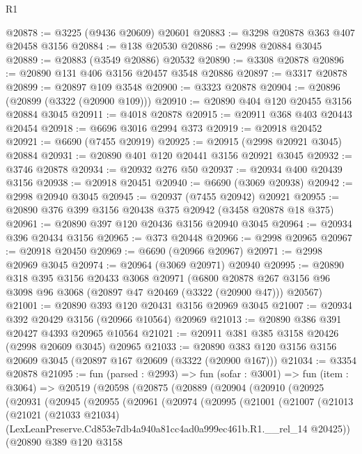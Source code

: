 \begin{lexlean}{R1}
\begin{coremodule}
@20878 := @3225 (@9436 @20609) @20601
@20883 := @3298 @20878 @363 @407 @20458 @3156
@20884 := @138 @20530
@20886 := @2998 @20884 @3045
@20889 := @20883 (@3549 @20886) @20532
@20890 := @3308 @20878
@20896 := @20890 @131 @406 @3156 @20457 @3548 @20886
@20897 := @3317 @20878
@20899 := @20897 @109 @3548
@20900 := @3323 @20878
@20904 := @20896 (@20899 (@3322 (@20900 @109)))
@20910 := @20890 @404 @120 @20455 @3156 @20884 @3045
@20911 := @4018 @20878
@20915 := @20911 @368 @403 @20443 @20454
@20918 := @6696 @3016 @2994 @373
@20919 := @20918 @20452
@20921 := @6690 (@7455 @20919)
@20925 := @20915 (@2998 @20921 @3045) @20884
@20931 := @20890 @401 @120 @20441 @3156 @20921 @3045
@20932 := @3746 @20878
@20934 := @20932 @276 @50
@20937 := @20934 @400 @20439 @3156
@20938 := @20918 @20451
@20940 := @6690 (@3069 @20938)
@20942 := @2998 @20940 @3045
@20945 := @20937 (@7455 @20942) @20921
@20955 := @20890 @376 @399 @3156 @20438 @375 @20942 (@3458 @20878 @18 @375)
@20961 := @20890 @397 @120 @20436 @3156 @20940 @3045
@20964 := @20934 @396 @20434 @3156
@20965 := @373 @20448
@20966 := @2998 @20965
@20967 := @20918 @20450
@20969 := @6690 (@20966 @20967)
@20971 := @2998 @20969 @3045
@20974 := @20964 (@3069 @20971) @20940
@20995 := @20890
    @318
    @395
    @3156
    @20433
    @3068
    @20971
    (@6800 @20878 @267 @3156 @96 @3098 @96 @3068 (@20897 @47 @20469 (@3322 (@20900 @47))) @20567)
@21001 := @20890 @393 @120 @20431 @3156 @20969 @3045
@21007 := @20934 @392 @20429 @3156 (@20966 @10564) @20969
@21013 := @20890 @386 @391 @20427 @4393 @20965 @10564
@21021 := @20911 @381 @385 @3158 @20426 (@2998 @20609 @3045) @20965
@21033 := @20890 @383 @120 @3156 @3156 @20609 @3045 (@20897 @167 @20609 (@3322 (@20900 @167)))
@21034 := @3354 @20878
@21095 := fun (parsed : @2993) =>
  fun (sofar : @3001) =>
  fun (item : @3064) =>
  @20519
    (@20598
      (@20875
        (@20889
          (@20904
            (@20910
              (@20925
                (@20931
                  (@20945
                    (@20955
                      (@20961
                        (@20974
                          (@20995
                            (@21001
                              (@21007
                                (@21013
                                  (@21021
                                    (@21033 @21034)
                                    (LexLeanPreserve.Cd853e7db4a940a81cc4ad0a999ec461b.R1.__rel_14
                                      @20425))
                                  (@20890
                                    @389
                                    @120
                                    @3158

\end{coremodule}
\end{lexlean}

